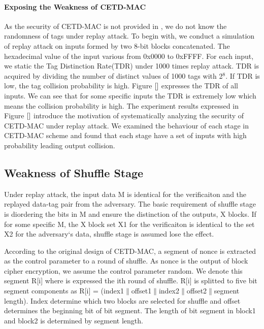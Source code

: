 \documentclass{article}
\begin{document}
\paragraph{Exposing the Weakness of CETD-MAC}
As the security of CETD-MAC is not provided in \cite{}, we do not know the randomness of tags under replay attack. To begin with, we conduct a simulation of replay attack on inputs formed by two 8-bit blocks concatenated. The hexadecimal value of the input various from 0x0000 to 0xFFFF. For each input, we static the Tag Distinction Rate(TDR) under 1000 times replay attack. TDR is acquired by dividing the number of distinct values of 1000 tags with 2$^8$. If TDR is low, the tag collision probability is high. Figure $\ref{}$ expresses the TDR of all inputs. We can see that for some specific inputs the TDR is extremely low which means the collision probability is high. The experiment results expressed in Figure $\ref{}$ introduce the motivation of systematically analyzing the security of CETD-MAC under replay attack. We examined the behaviour of each stage in CETD-MAC scheme and found that each stage have a set of inputs with high probability leading output collision.

\subsection{Weakness of Shuffle Stage}
Under replay attack, the input data M is identical for the verificaiton and
the replayed data-tag pair from the adversary. The basic requirement of shuffle
stage is diordering the bits in M and ensure the distinction of the outputs, X
blocks. If for some specific M, the X block set X1 for the verificaiton is
identical to the set X2 for the adversary`s data, shuffle stage is assumed lose
the effect.

According to the
original design of CETD-MAC, a segment of nonce is extracted as the control
parameter to a round of shuffle.  As nonce is the output of block cipher
encryption, we assume the control parameter random. We denote this segment R[i] where is expressed
the ith round of shuffle. R[i] is splitted to five bit segment components as R[i] =
(index1$\|$offset1$\|$index2$\|$offset2$\|$segment length). Index determine
which two blocks are selected for shuffle and offset determines the beginning
bit of bit segment. The length of bit segment in block1 and block2 is determined
by segment length. 
\end{document}
